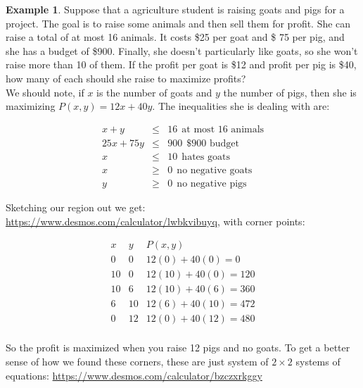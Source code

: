 \documentclass[10pt]{article}
\theoremstyle{definition}
\newtheorem{example}[equation]{Example}
\begin{document}
\begin{example}

Suppose that a agriculture student is raising goats and pigs for a project.  The goal is to raise some animals and then sell them for profit.  She can raise a total of at most 16 animals.  It costs \$25 per goat and \$ 75 per pig, and she has a budget of \$900.  Finally, she doesn't particularly like goats, so she won't raise more than 10 of them.  If the profit per goat is \$12 and profit per pig is \$40, how many of each should she raise to maximize profits?\\

We should note, if $x$ is the number of goats and $y$ the number of pigs, then she is maximizing $P(x,y)=12x+40y$.  The inequalities she is dealing with are:

\begin{eqnarray*}
x+y&\leq&16\ \ \text{at most 16 animals}\\
25x+75y&\leq&900\ \ \text{\$900 budget}\\
x&\leq&10\ \ \text{hates goats}\\
x&\geq&0\ \ \text{no negative goats}\\
y&\geq&0\ \ \text{no negative pigs}
\end{eqnarray*}

Sketching our region out we get:  \url{https://www.desmos.com/calculator/lwbkvibuyq}, with corner points:

$$\begin{array}{c|c|c}
x & y & P(x,y)\\
\hline
0 & 0 & 12(0)+40(0)=0\\
10 & 0 & 12(10)+40(0)=120\\
10 & 6 & 12(10)+40(6)=360\\
6 & 10 & 12(6)+40(10)=472\\
0 & 12 & 12(0)+40(12)=480\\
\end{array}$$

So the profit is maximized when you raise 12 pigs and no goats.  To get a better sense of how we found these corners, these are just system of $2\times 2$ systems of equations: \url{https://www.desmos.com/calculator/bzczxrkggy}


\end{example}
\end{document}

